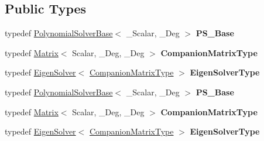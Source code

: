 \subsection*{Public Types}
\begin{DoxyCompactItemize}
\item 
\mbox{\label{class_eigen_1_1_polynomial_solver_a6c1f40c9dae2575137d0dea21765d295}} 
typedef \hyperlink{class_eigen_1_1_polynomial_solver_base}{Polynomial\+Solver\+Base}$<$ \+\_\+\+Scalar, \+\_\+\+Deg $>$ {\bfseries P\+S\+\_\+\+Base}
\item 
\mbox{\label{class_eigen_1_1_polynomial_solver_a3c77ec640a0dbf1fa35c2a05ad68d751}} 
typedef \hyperlink{group___core___module_class_eigen_1_1_matrix}{Matrix}$<$ Scalar, \+\_\+\+Deg, \+\_\+\+Deg $>$ {\bfseries Companion\+Matrix\+Type}
\item 
\mbox{\label{class_eigen_1_1_polynomial_solver_ab80550e9fd2d1bc76fe7409ea36347df}} 
typedef \hyperlink{group___eigenvalues___module_class_eigen_1_1_eigen_solver}{Eigen\+Solver}$<$ \hyperlink{group___core___module_class_eigen_1_1_matrix}{Companion\+Matrix\+Type} $>$ {\bfseries Eigen\+Solver\+Type}
\item 
\mbox{\label{class_eigen_1_1_polynomial_solver_a6c1f40c9dae2575137d0dea21765d295}} 
typedef \hyperlink{class_eigen_1_1_polynomial_solver_base}{Polynomial\+Solver\+Base}$<$ \+\_\+\+Scalar, \+\_\+\+Deg $>$ {\bfseries P\+S\+\_\+\+Base}
\item 
\mbox{\label{class_eigen_1_1_polynomial_solver_a3c77ec640a0dbf1fa35c2a05ad68d751}} 
typedef \hyperlink{group___core___module_class_eigen_1_1_matrix}{Matrix}$<$ Scalar, \+\_\+\+Deg, \+\_\+\+Deg $>$ {\bfseries Companion\+Matrix\+Type}
\item 
\mbox{\label{class_eigen_1_1_polynomial_solver_ab80550e9fd2d1bc76fe7409ea36347df}} 
typedef \hyperlink{group___eigenvalues___module_class_eigen_1_1_eigen_solver}{Eigen\+Solver}$<$ \hyperlink{group___core___module_class_eigen_1_1_matrix}{Companion\+Matrix\+Type} $>$ {\bfseries Eigen\+Solver\+Type}
\end{DoxyCompactItemize}
